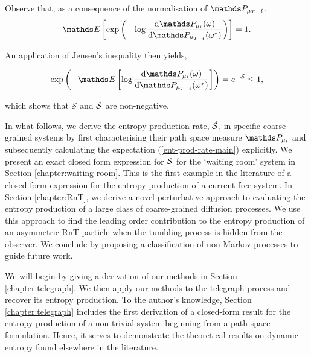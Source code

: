 Observe that, as a consequence of the normalisation of $\bP_{\mu_T-t}$,
\begin{align}
\bE \left [\exp \left ( -\log \frac{\rmd\bP_{\mu_t}(\omega)}{\rmd\bP_{\mu_{T-t}}(\omega^\ast)}\right) \right] = 1. 
\end{align}

An application of Jensen's inequality then yields, 

\begin{align}
\exp\left ( -\bE \left[ \log \frac{\rmd\bP_{\mu_t}(\omega)}{\rmd\bP_{\mu_{T-t}}(\omega^\ast)}\right]\right) = e^{-\mathcal{S}} \leq 1,
\end{align}

which shows that $\mathcal{S}$ and $\dot{\mathcal{S}}$ are non-negative. 

In what follows, we  derive the entropy production rate, $\dot{\mathcal{S}}$, in specific coarse-grained systems by first characterising their path space measure $\bP_{\mu_t}$ and subsequently calculating the expectation (\ref{ent-prod-rate-main}) explicitly. We present an exact closed form expression for $\dot{\mathcal{S}}$ for the `waiting room' system in Section \ref{chapter:waiting-room}. This is the first example in the literature of a closed form expression for the entropy production of a current-free system. In Section \ref{chapter:RnT}, we derive a novel perturbative approach to evaluating the entropy production of a large class of coarse-grained diffusion processes. We use this approach to find the leading order contribution to the entropy production of an asymmetric RnT particle when the tumbling process is hidden from the observer. We conclude by proposing a classification of non-Markov processes to guide future work.

We will begin by giving a derivation of our methods in Section \ref{chapter:telegraph}. We then apply our methods to the telegraph process and recover its entropy production. To the author's knowledge, Section \ref{chapter:telegraph} includes the first derivation of a closed-form result for the entropy production of a non-trivial system beginning from a path-space formulation. Hence, it serves to demonstrate the theoretical results on dynamic entropy found elsewhere in the literature. \newpage











